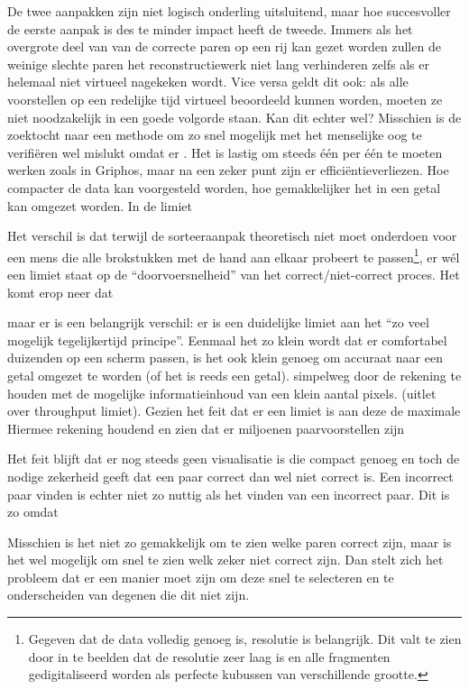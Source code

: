 De twee aanpakken zijn niet logisch onderling uitsluitend, maar hoe succesvoller de eerste aanpak is des te minder impact heeft de tweede. Immers als het overgrote deel van van de correcte paren op een rij kan gezet worden zullen de weinige slechte paren het reconstructiewerk niet lang verhinderen zelfs als er helemaal niet virtueel nagekeken wordt. Vice versa geldt dit ook: als alle voorstellen op een redelijke tijd virtueel beoordeeld kunnen worden, moeten ze niet noodzakelijk in een goede volgorde staan. Kan dit echter wel? Misschien is de zoektocht naar een methode om zo snel mogelijk met het menselijke oog te verifi\"eren wel mislukt omdat er . Het is lastig om steeds \'e\'en per \'e\'en te moeten werken zoals in Griphos, maar na een zeker punt zijn er effici\"entieverliezen.
 Hoe compacter de data kan voorgesteld worden, hoe gemakkelijker het in een getal kan omgezet worden. In de limiet  

Het verschil is dat terwijl de sorteeraanpak theoretisch niet moet onderdoen voor een mens die alle brokstukken met de hand aan elkaar probeert te passen\footnote{Gegeven dat de data volledig genoeg is, resolutie is belangrijk. Dit valt te zien door in te beelden dat de resolutie zeer laag is en alle fragmenten gedigitaliseerd worden als perfecte kubussen van verschillende grootte.}, er w\'el een limiet staat op de ``doorvoersnelheid'' van het correct/niet-correct proces. Het komt erop neer dat 

maar er is een belangrijk verschil: er is een duidelijke limiet aan het ``zo veel mogelijk tegelijkertijd principe''. Eenmaal het zo klein wordt dat er comfortabel duizenden op een scherm passen, is het ook klein genoeg om accuraat naar een getal omgezet te worden (of het is reeds een getal).  simpelweg door de rekening te houden met de mogelijke informatieinhoud van een klein aantal pixels. (uitlet over throughput limiet). Gezien het feit dat er een limiet is aan deze de maximale Hiermee rekening houdend en zien dat er miljoenen paarvoorstellen zijn 

Het feit blijft dat er nog steeds geen visualisatie is die compact genoeg en toch de nodige zekerheid geeft dat een paar correct dan wel niet correct is. Een incorrect paar vinden is echter niet zo nuttig als het vinden van een incorrect paar. Dit is zo omdat 

Misschien is het niet zo gemakkelijk om te zien welke paren correct zijn, maar is het wel mogelijk om snel te zien welk zeker niet correct zijn. Dan stelt zich het probleem dat er een manier moet zijn om deze snel te selecteren en te onderscheiden van degenen die dit niet zijn.

